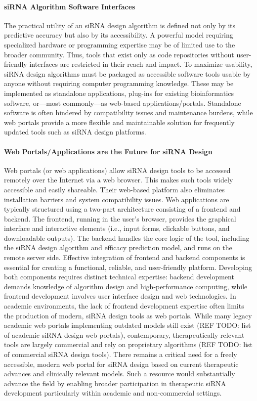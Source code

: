 \documentclass{report}
\begin{document}
\paragraph{siRNA Algorithm Software Interfaces}
The practical utility of an siRNA design algorithm is defined not only by its predictive accuracy but also by its accessibility. A powerful model requiring specialized hardware or programming expertise may be of limited use to the broader community. Thus, tools that exist only as code repositories without user-friendly interfaces are restricted in their reach and impact. To maximize usability, siRNA design algorithms must be packaged as accessible software tools usable by anyone without requiring computer programming knowledge. These may be implemented as standalone applications, plug-ins for existing bioinformatics software, or—most commonly—as web-based applications/portals. Standalone software is often hindered by compatibility issues and maintenance burdens, while web portals provide a more flexible and maintainable solution for frequently updated tools such as siRNA design platforms.

\paragraph{Web Portals/Applications are the Future for siRNA Design}
Web portals (or web applications) allow siRNA design tools to be accessed remotely over the Internet via a web browser. This makes such tools widely accessible and easily shareable. Their web-based platform also eliminates installation barriers and system compatibility issues. Web applications are typically structured using a two-part architecture consisting of a frontend and backend. The frontend, running in the user’s browser, provides the graphical interface and interactive elements (i.e., input forms, clickable buttons, and downloadable outputs). The backend handles the core logic of the tool, including the siRNA design algorithm and efficacy prediction model, and runs on the remote server side. Effective integration of frontend and backend components is essential for creating a functional, reliable, and user-friendly platform. Developing both components requires distinct technical expertise: backend development demands knowledge of algorithm design and high-performance computing, while frontend development involves user interface design and web technologies. In academic environments, the lack of frontend development expertise often limits the production of modern, siRNA design tools as web portals. While many legacy academic web portals implementing outdated models still exist (REF TODO: list of academic siRNA design web portals), contemporary, therapeutically relevant tools are largely commercial and rely on proprietary algorithms (REF TODO: list of commercial siRNA design tools). There remains a critical need for a freely accessible, modern web portal for siRNA design based on current therapeutic advances and clinically relevant models. Such a resource would substantially advance the field by enabling broader participation in therapeutic siRNA development particularly within academic and non-commercial settings.
\end{document}
